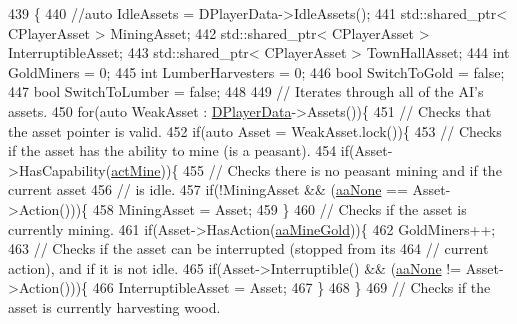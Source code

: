 \begin{DoxyCode}
439                                                                               \{
440     \textcolor{comment}{//auto IdleAssets = DPlayerData->IdleAssets();}
441     std::shared\_ptr< CPlayerAsset > MiningAsset;
442     std::shared\_ptr< CPlayerAsset > InterruptibleAsset;
443     std::shared\_ptr< CPlayerAsset > TownHallAsset;
444     \textcolor{keywordtype}{int} GoldMiners = 0;
445     \textcolor{keywordtype}{int} LumberHarvesters = 0;
446     \textcolor{keywordtype}{bool} SwitchToGold = \textcolor{keyword}{false};
447     \textcolor{keywordtype}{bool} SwitchToLumber = \textcolor{keyword}{false};
448     
449     \textcolor{comment}{// Iterates through all of the AI's assets.}
450     \textcolor{keywordflow}{for}(\textcolor{keyword}{auto} WeakAsset : \hyperlink{classCAIPlayer_a83b5113c8f7e80df54940b647c5ee2e6}{DPlayerData}->Assets())\{
451         \textcolor{comment}{// Checks that the asset pointer is valid.}
452         \textcolor{keywordflow}{if}(\textcolor{keyword}{auto} Asset = WeakAsset.lock())\{
453             \textcolor{comment}{// Checks if the asset has the ability to mine (is a peasant).}
454             \textcolor{keywordflow}{if}(Asset->HasCapability(\hyperlink{GameDataTypes_8h_a35b98ce26aca678b03c6f9f76e4778cea2e0db284fd05caa56e3867c661ccdd8b}{actMine}))\{
455                 \textcolor{comment}{// Checks there is no peasant mining and if the current asset}
456                 \textcolor{comment}{// is idle.}
457                 \textcolor{keywordflow}{if}(!MiningAsset && (\hyperlink{GameDataTypes_8h_ab47668e651a3032cfb9c40ea2d60d670ac17cc5a0035320c060d7f8074143b507}{aaNone} == Asset->Action()))\{
458                     MiningAsset = Asset;
459                 \}
460                 \textcolor{comment}{// Checks if the asset is currently mining.}
461                 \textcolor{keywordflow}{if}(Asset->HasAction(\hyperlink{GameDataTypes_8h_ab47668e651a3032cfb9c40ea2d60d670abc45b1c4fbca1481e373a780a69bd56b}{aaMineGold}))\{
462                     GoldMiners++; 
463                     \textcolor{comment}{// Checks if the asset can be interrupted (stopped from its}
464                     \textcolor{comment}{// current action), and if it is not idle.}
465                     \textcolor{keywordflow}{if}(Asset->Interruptible() && (\hyperlink{GameDataTypes_8h_ab47668e651a3032cfb9c40ea2d60d670ac17cc5a0035320c060d7f8074143b507}{aaNone} != Asset->Action()))\{
466                         InterruptibleAsset = Asset;
467                     \}
468                 \}
469                 \textcolor{comment}{// Checks if the asset is currently harvesting wood.}

\end{DoxyCode}
